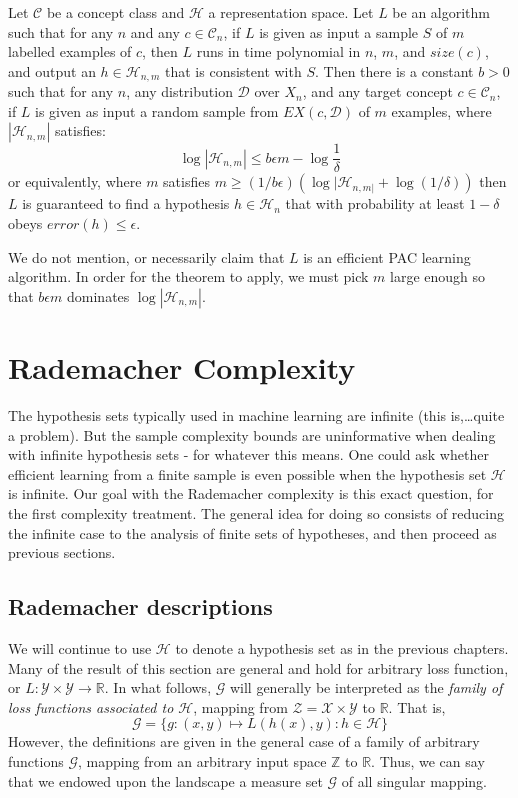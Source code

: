 \begin{theorem}
    Let $\mathcal{C}$ be a concept class and $\mathcal{H}$ a representation space. Let $L$ be an algorithm such that for any $n$ and any $c\in \mathcal{C}_{n}$, if $L$ is given as input a sample $S$ of $m$ labelled examples of $c$, then $L$ runs in time polynomial in $n$, $m$, and $size(c)$, and output an $h\in \mathcal{H}_{n,m}$ that is consistent with $S$. Then there is a constant $b>0$ such that for any $n$, any distribution $\mathcal{D}$ over $X_{n}$, and any target concept $c\in \mathcal{C}_{n}$, if $L$ is given as input a random sample from $EX(c,\mathcal{D})$ of $m$ examples, where $|\mathcal{H}_{n,m}|$ satisfies: 
    \begin{equation}
        \log{|\mathcal{H}_{n,m}|} \leq b \epsilon m - \log{\frac{1}{\delta}}
    \end{equation} 
    or equivalently, where $m$ satisfies $m\geq (1/b\epsilon)(\log{|\mathcal{H}_{n,m|}}+ \log{(1/\delta)})$ then $L$ is guaranteed to find a hypothesis $h\in \mathcal{H}_{n}$ that with probability at least $1-\delta$ obeys $error(h)\leq \epsilon$. 
\end{theorem}
We do not mention, or necessarily claim that $L$ is an efficient PAC learning algorithm. In order for the theorem to apply, we must pick $m$ large enough so that $b\epsilon m$ dominates $\log{|\mathcal{H}_{n,m}|}$. 
\section{Rademacher Complexity}
The hypothesis sets typically used in machine learning are infinite (this is,\dots quite a problem). But the sample complexity bounds are uninformative when dealing with infinite hypothesis sets - for whatever this means. One could ask whether efficient learning from a finite sample is even possible when the hypothesis set $\mathcal{H}$ is infinite. Our goal with the Rademacher complexity is this exact question, for the first complexity treatment. The general idea for doing so consists of reducing the infinite case to the analysis of finite sets of hypotheses, and then proceed as previous sections. 
\subsection{Rademacher descriptions}
We will continue to use $\mathcal{H}$ to denote a hypothesis set as in the previous chapters. Many of the result of this section are general and hold for arbitrary loss function, or $L: \mathcal{Y}\times \mathcal{Y}\to \mathbb{R}$. In what follows, $\mathcal{G}$ will generally be interpreted as the \textit{family of loss functions associated to $\mathcal{H}$}, mapping from $\mathcal{Z}=\mathcal{X}\times\mathcal{Y}$ to $\mathbb{R}$. That is, \begin{equation*}
    \mathcal{G} = \{g: (x,y)\mapsto L(h(x),y): h\in \mathcal{H}\}
\end{equation*}
However, the definitions are given in the general case of a family of arbitrary functions $\mathcal{G}$, mapping from an arbitrary input space $\mathbb{Z}$ to $\mathbb{R}$. Thus, we can say that we endowed upon the landscape a measure set $\mathcal{G}$ of all singular mapping. 

